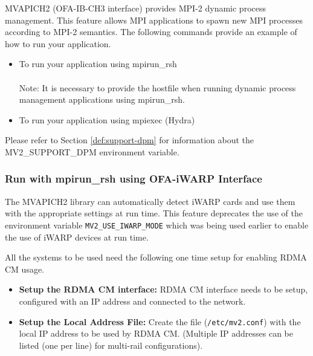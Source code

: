 MVAPICH2 (OFA-IB-CH3 interface) provides MPI-2 dynamic
process management. This feature
allows MPI applications to spawn new MPI processes according to MPI-2 semantics. The following commands provide an example of how to run your application.
\begin{itemize}
\item To run your application using mpirun\_rsh\\
\\
Note: It is necessary to provide the hostfile when running dynamic process management applications using mpirun\_rsh.
\item To run your application using mpiexec (Hydra)\\
\end{itemize}
Please refer to Section \ref{def:support-dpm} for information about the
MV2\_SUPPORT\_DPM environment variable.


\subsubsection{Run with mpirun\_rsh using OFA-iWARP Interface}
\label{subsec:mpi-iwarp}

The MVAPICH2 library can automatically detect iWARP cards and use them with
the appropriate settings at run time. This feature deprecates the use of
the environment variable \texttt{MV2\_USE\_IWARP\_MODE} which was being
used earlier to enable the use of iWARP devices at run time.

All the systems to be used need the following one time setup for enabling
RDMA CM usage.

\begin{itemize}
		\item {\bf Setup the RDMA CM interface:} RDMA CM interface needs to be
				setup, configured with an IP address and connected to
				the network.  \\
		\item {\bf Setup the Local Address File:} Create the file
				(\texttt{/etc/mv2.conf}) with the local IP address
				to be used by RDMA CM. (Multiple IP
                                addresses can
                                be listed (one per line) for multi-rail configurations).
				\\
\end{itemize}

